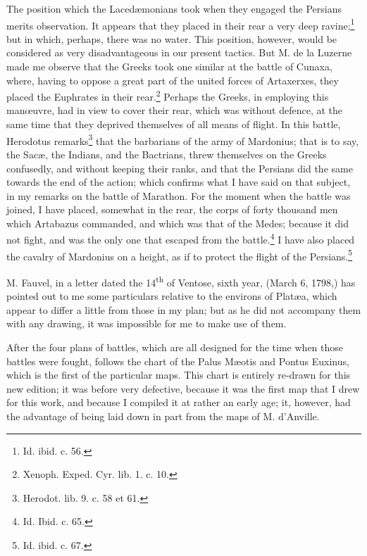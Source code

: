 \documentclass[a4paper, 11pt, oneside, polutonikogreek, english]{article}
\begin{document}
The position which the Lacedæmonians took when they engaged the Persians merits observation. It appears that they placed in their rear a very deep ravine;\footnote{Id. ibid. c. 56.} but in which, perhaps, there was no water. This position, however, would be considered as very disadvantageous in our present tactics. But M. de la Luzerne made me observe that the Greeks took one similar at the battle of Cunaxa, where, having to oppose a great part of the united forces of Artaxerxes, they placed the Euphrates in their rear.\footnote{Xenoph. Exped. Cyr. lib. 1. c. 10.} Perhaps the Greeks, in employing this manœuvre, had in view to cover their rear, which was without defence, at the same time that they deprived themselves of all means of flight. In this battle, Herodotus remarks\footnote{Herodot. lib. 9. c. 58 et 61.} that the barbarians of the army of Mardonius; that is to say, the Sacæ, the Indians, and the Bactrians, threw themselves on the Greeks confusedly, and without keeping their ranks, and that the Persians did the same towards the end of the action; which confirms what I have said on that subject, in my remarks on the battle of Marathon. For the moment when the battle was joined, I have placed, somewhat in the rear, the corps of forty thousand men which Artabazus commanded, and which was that of the Medes; because it did not fight, and was the only one that escaped from the battle.\footnote{Id. Ibid. c. 65.} I have also placed the cavalry of Mardonius on a height, as if to protect the flight of the Persians.\footnote{Id. ibid. c. 67.}

M. Fauvel, in a letter dated the 14\textsuperscript{th} of Ventose, sixth year, (March 6, 1798,) has pointed out to me some particulars relative to the environs of Platæa, which appear to differ a little from those in my plan; but as he did not accompany them with any drawing, it was impossible for me to make use of them.

After the four plans of battles, which are all designed for the time when those battles were fought, follows the chart of the Palus Mæotis and Pontus Euxinus, which is the first of the particular maps. This chart is entirely re-drawn for this new edition; it was before very defective, because it was the first map that I drew for this work, and because I compiled it at rather an early age; it, however, had the advantage of being laid down in part from the maps of M. d'Anville.
\end{document}
